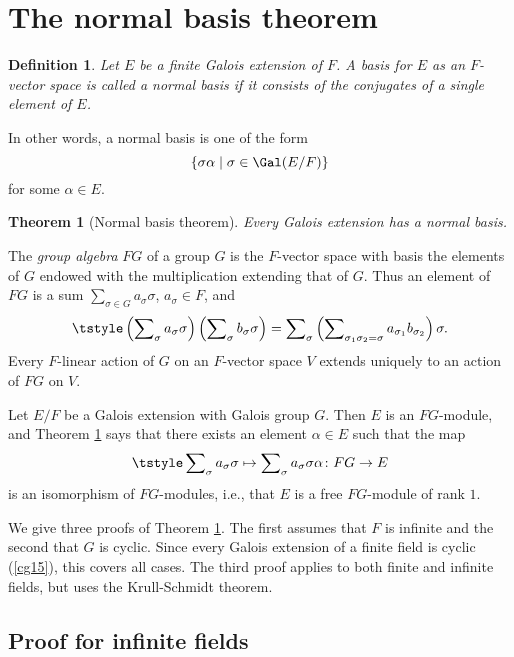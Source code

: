 \documentclass[a4paper,11pt,final,openany]{memoir}
\newtheorem{theorem}[X]{Theorem}
\newtheorem{definition}[X]{Definition}
\theoremstyle{nonumberplain}
\begin{document}
\section{The normal basis theorem}%

%


\begin{definition}
\label{ag14a}Let $E$ be a finite Galois extension of $F$. A basis for $E$ as
an $F$-vector space is called a \emph{normal basis }%
if it consists of the conjugates of a single element of $E$.
\end{definition}

In other words, a normal basis is one of the form%
\[
\{\sigma\alpha\mid\sigma\in\Gal(E/F)\}
\]
for some $\alpha\in E$.

\begin{theorem}
[Normal basis theorem]\label{ag14b}Every Galois extension has a normal basis.
\end{theorem}

The%
\emph{group algebra} $FG$ of a group $G$ is the $F$-vector space with basis
the elements of $G$ endowed with the multiplication extending that of $G$.
Thus an element of $FG$ is a sum $\sum_{\sigma\in G}a_{\sigma}\sigma$,
$a_{\sigma}\in F$, and
\[
\tstyle\left(  \sum\nolimits_{\sigma}a_{\sigma}\sigma\right)  \left(
\sum\nolimits_{\sigma}b_{\sigma}\sigma\right)  =\sum\nolimits_{\sigma}\left(
\sum\nolimits_{\sigma_{1}\sigma_{2}=\sigma}a_{\sigma_{1}}b_{\sigma_{2}%
}\right)  \sigma.
\]
Every $F$-linear action of $G$ on an $F$-vector space $V$ extends uniquely to
an action of $FG$ on $V$.

Let $E/F$ be a Galois extension with Galois group $G$. Then $E$ is an
$FG$-module, and Theorem \ref{ag14b} says that there exists an element
$\alpha\in E$ such that the map%
\[
\tstyle\sum\nolimits_{\sigma}a_{\sigma}\sigma\mapsto\sum\nolimits_{\sigma
}a_{\sigma}\sigma\alpha\colon FG\rightarrow E
\]
is an isomorphism of $FG$-modules, i.e., that $E$ is a free $FG$-module of
rank $1.$

We give three proofs of Theorem \ref{ag14b}. The first assumes that $F$ is
infinite and the second that $G$ is cyclic. Since every Galois extension of a
finite field is cyclic (\ref{cg15}), this covers all cases. The third proof
applies to both finite and infinite fields, but uses the Krull-Schmidt theorem.

\subsection{Proof for infinite fields}
\end{document}
